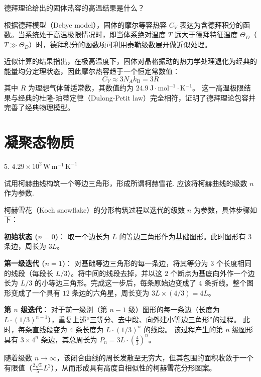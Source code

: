 \begin{exercise}\label{ex:27.14}
德拜理论给出的固体热容的高温结果是什么？
\end{exercise}
\begin{solution}
根据德拜模型（Debye model），固体的摩尔等容热容 $C_V$ 表达为含德拜积分的函数。当系统处于高温极限情况时，即当体系绝对温度 $T$ 远大于德拜特征温度 $\Theta_D$（$T \gg \Theta_D$）时，德拜积分的函数项可利用泰勒级数展开做近似处理。

近似计算的结果指出，在极高温度下，固体对晶格振动的热力学处理退化为经典的能量均分定理状态，因此摩尔热容趋于一个恒定常数值：
$$ C_V \approx 3 N_A k_{\mathrm{B}} = 3 R $$
其中 $R$ 为理想气体普适常数，其数值约为 $24.9 \ \mathrm{J \cdot mol^{-1} \cdot K^{-1}}$。
这一高温极限结果与经典的杜隆-珀蒂定律（Dulong-Petit law）完全相符，证明了德拜理论包容并完善了经典物理模型。
\end{solution}




\chapter{凝聚态物质}

\begin{oddanswers}
5. $4.29 \times 10^2\,\mathrm{W\,m^{-1}\,K^{-1}}$
\end{oddanswers}

\begin{exercise}\label{ex:28.1}
试用柯赫曲线构筑一个等边三角形，形成所谓柯赫雪花. 应该将柯赫曲线的级数 $n$ 作为参数.
\end{exercise}
\begin{solution}
柯赫雪花（Koch snowflake）的分形构筑过程以迭代的级数 $n$ 为参数，具体步骤如下：

\textbf{初始状态 ($n=0$)}：
取一个边长为 $L$ 的等边三角形作为基础图形。此时图形有 $3$ 条边，周长为 $3L$。

\textbf{第一级迭代 ($n=1$)}：
对基础等边三角形的每一条边，将其等分为 $3$ 个长度相同的线段（每段长 $L/3$）。将中间的线段去掉，并以这 $2$ 个断点为基底向外作一个边长为 $L/3$ 的小等边三角形。完成这一步后，每条原始边变成了 $4$ 条折线。整个图形变成了一个具有 $12$ 条边的六角星，周长变为 $3L \times (4/3) = 4L$。

\textbf{第 $n$ 级迭代}：
对于前一级别（第 $n-1$ 级）图形的每一条边（长度为 $L \cdot (1/3)^{n-1}$），重复上述“三等分、去中段、向外建小等边三角形”的过程。
此时，每条直线段变为 $4$ 条长度为 $L \cdot (1/3)^n$ 的线段。
该过程产生的第 $n$ 级图形具有 $3 \times 4^n$ 条边，其总周长为 $P_n = 3L \cdot \left(\frac{4}{3}\right)^n$。

随着级数 $n \to \infty$，该闭合曲线的周长发散至无穷大，但其包围的面积收敛于一个有限值（$\frac{2\sqrt{3}}{5} L^2$），从而形成具有高度自相似性的柯赫雪花分形图案。
\end{solution}

